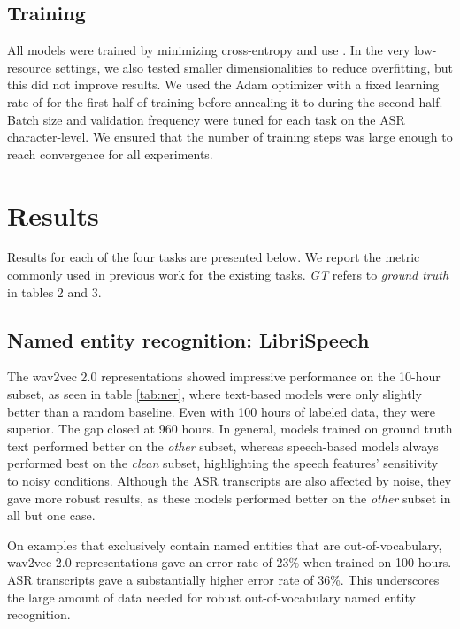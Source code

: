 \documentclass{article}
\begin{document}
\subsection{Training}
\label{sec:training}
All models were trained by minimizing cross-entropy and use . In the very low-resource settings, we also tested smaller dimensionalities to reduce overfitting, but this did not improve results. We used the Adam optimizer \cite{kingma2014adam} with a fixed learning rate of  for the first half of training before annealing it to  during the second half. Batch size and validation frequency were tuned for each task on the ASR character-level. We ensured that the number of training steps was large enough to reach convergence for all experiments.








\section{Results}
\label{sec:results}

Results for each of the four tasks are presented below. We report the metric commonly used in previous work for the existing tasks. \textit{GT} refers to \textit{ground truth} in tables 2 and 3.

\subsection{Named entity recognition: LibriSpeech}
\label{sec:ner-res}

The wav2vec 2.0 representations showed impressive performance on the 10-hour subset, as seen in table \ref{tab:ner}, where text-based models were only slightly better than a random baseline. Even with 100 hours of labeled data, they were superior. The gap closed at 960 hours. In general, models trained on ground truth text performed better on the \textit{other} subset, whereas speech-based models always performed best on the \textit{clean} subset, highlighting the speech features' sensitivity to noisy conditions. Although the ASR transcripts are also affected by noise, they gave more robust results, as these models performed better on the \textit{other} subset in all but one case. 

On examples that exclusively contain named entities that are out-of-vocabulary, wav2vec 2.0 representations gave an error rate of 23\% when trained on 100 hours. ASR transcripts gave a substantially higher error rate of 36\%. This underscores the large amount of data needed for robust out-of-vocabulary named entity recognition.
\end{document}
